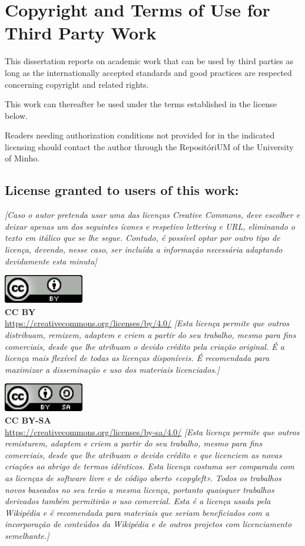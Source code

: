 \chapter*{Copyright and Terms of Use for Third Party Work}
\noindent
This dissertation reports on academic work that can be used by third parties as long as the internationally accepted standards and good practices are respected concerning copyright and related rights.

\noindent
This work can thereafter be used under the terms established in the license below.

\noindent
Readers needing authorization conditions not provided for in the indicated licensing should contact the author through the RepositóriUM of the University of Minho.

\section*{License granted to users of this work:}

\textit{[Caso o autor pretenda usar uma das licenças Creative Commons, deve escolher e deixar apenas um dos seguintes ícones e respetivo lettering e URL, eliminando o texto em itálico que se lhe segue. Contudo, é possível optar por outro tipo de licença, devendo, nesse caso, ser incluída a informação necessária adaptando devidamente esta minuta]}

\noindent
\includegraphics[]{images/CCBY.png}
\\
\textbf{CC BY}
\\
\url{https://creativecommons.org/licenses/by/4.0/}
\textit{[Esta licença permite que outros distribuam, remixem, adaptem e criem a partir do seu trabalho, mesmo para fins comerciais, desde que lhe atribuam o devido crédito pela criação original. É a licença mais flexível de todas as licenças disponíveis. É recomendada para maximizar a disseminação e uso dos materiais licenciados.]}


\noindent
\includegraphics[]{images/CCBYSA.png}
\\
\textbf{CC BY-SA}
\\
\url{https://creativecommons.org/licenses/by-sa/4.0/}
\textit{[Esta licença permite que outros remisturem, adaptem e criem a partir do seu trabalho, mesmo para fins comerciais, desde que lhe atribuam o devido crédito e que licenciem as novas criações ao abrigo de termos idênticos. Esta licença costuma ser comparada com as licenças de software livre e de código aberto «copyleft». Todos os trabalhos novos baseados no seu terão a mesma licença, portanto quaisquer trabalhos derivados também permitirão o uso comercial. Esta é a licença usada pela Wikipédia e é recomendada para materiais que seriam beneficiados com a incorporação de conteúdos da Wikipédia e de outros projetos com licenciamento semelhante.]}

